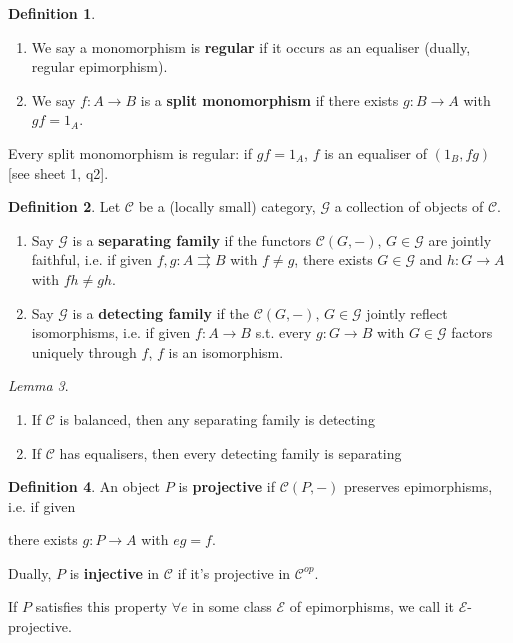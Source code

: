 \documentclass[a4paper]{article}
\theoremstyle{definition}
\newtheorem{definition}{Definition}
\theoremstyle{remark}
\theoremstyle{default}
\newtheorem{lemma}[definition]{Lemma}
\numberwithin{definition}{section}
\begin{document}
\begin{definition}
	\begin{enumerate}[label=\alph*.]
		\item We say a monomorphism is \textbf{regular} if it occurs as an equaliser (dually, regular epimorphism).
		\item We say $f: A \to B$ is a \textbf{split monomorphism} if there exists $g: B \to A$ with $gf = 1_A$.
	\end{enumerate}
\end{definition}

Every split monomorphism is regular:
if $gf = 1_A$, $f$ is an equaliser of $(1_B, fg)$ [see sheet 1, q2].

\begin{definition}
	Let $\mathcal{C}$ be a (locally small) category, $\mathcal{G}$ a collection of objects of $\mathcal{C}$.
	\begin{enumerate}[label=\alph*.]
		\item Say $\mathcal{G}$ is a \textbf{separating family} if the functors $\mathcal{C}(G, -),\, G \in \mathcal{G}$ are jointly faithful,
		i.e. if given $f,g : A \rightrightarrows B$ with $f \neq g$,
		there exists $G \in \mathcal{G}$ and $h: G \to A$ with $fh \neq gh$.
		\item Say $\mathcal{G}$ is a \textbf{detecting family} if the $\mathcal{C}(G, -),\, G \in \mathcal{G}$ jointly reflect isomorphisms,
		i.e. if given $f: A \to B$ s.t. every $g: G \to B$ with $G \in \mathcal{G}$ factors uniquely through $f$,
		$f$ is an isomorphism.
	\end{enumerate}
\end{definition}

\begin{lemma}
	\begin{enumerate}[label=\roman*.]
		\item If $\mathcal{C}$ is balanced, then any separating family is detecting
		\item If $\mathcal{C}$ has equalisers, then every detecting family is separating
	\end{enumerate}
\end{lemma}

\begin{definition}
	An object $P$ is \textbf{projective} if $\mathcal{C}(P, -)$ preserves epimorphisms, i.e. if given
	\begin{center}
	\end{center}
	there exists $g: P \to A$ with $eg = f$.
	
	Dually, $P$ is \textbf{injective} in $\mathcal{C}$ if it's projective in $\mathcal{C}^{op}$.
	
	If $P$ satisfies this property $\forall e$ in some class $\mathcal{E}$ of epimorphisms,
	we call it $\mathcal{E}$-projective.
\end{definition}
\end{document}
